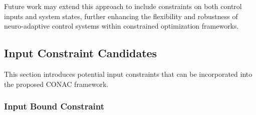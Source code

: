 \documentclass[letterpaper, journal]{IEEEtran}
\begin{document}
Future work may extend this approach to include constraints on both control inputs and system states, further enhancing the flexibility and robustness of neuro-adaptive control systems within constrained optimization frameworks.

\appendix

\subsection{Input Constraint Candidates}\label{sec:appen:cstr} 

This section introduces potential input constraints that can be incorporated into the proposed CONAC framework.

\subsubsection{Input Bound Constraint}\label{sec:appen:cstr:input:bound}
\end{document}
